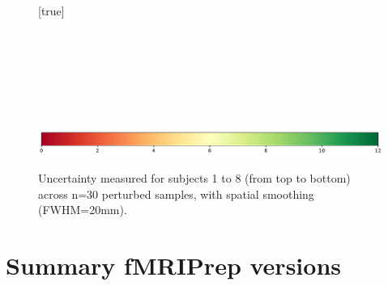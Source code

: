 \documentclass{article}
\newcommand{\fmriprep}{fMRIPrep\xspace}
\begin{document}
\begin{appendices}
    \begin{landscape}
        \begin{figure}
            \vspace*{-2cm}
            \centering
            [true] \\
             \\
             \\
             \\
             \\
             \\
             \\
             \\
            \includegraphics*[width=.7\linewidth]{figures/colorbar_sigbit.pdf}
            \caption{Uncertainty measured for subjects 1 to 8 (from top to bottom) across n=30 perturbed samples, with spatial smoothing (FWHM=20mm). }
            \label{fig:uncertainty-maps-20mm}
        \end{figure}
    \end{landscape}

    \section*{Summary \fmriprep versions}


\end{appendices}
\end{document}
